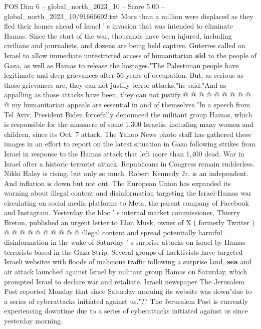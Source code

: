 \begin{textsample}{POS Dim 6 – global\_north\_2023\_10 – Score 5.00 – global\_north\_2023\_10/91666602.txt}
More than a million were displaced as they fled their homes ahead of Israel ' s invasion that was intended to eliminate Hamas.
Since the start of the war, thousands have been injured, including civilians and journalists, and dozens are being held captive.
Guterres called on Israel to allow immediate unrestricted access of humanitarian \textbf{aid} to the people of Gaza, as well as Hamas to release the hostages."The Palestinian people have legitimate and deep grievances after 56 years of occupation.
But, as serious as those grievances are, they can not justify terror attacks,"he said."And as appalling as those attacks have been, they can not justify @ @ @ @ @ @ @ @ @ @ my humanitarian appeals are essential in and of themselves."In a speech from Tel Aviv, President Biden forcefully denounced the militant group Hamas, which is responsible for the massacre of some 1,300 Israelis, including many women and children, since its Oct. 7 attack.
The Yahoo News photo staff has gathered these images in an effort to report on the latest situation in Gaza following strikes from Israel in response to the Hamas attack that left more than 1,400 dead.
War in Israel after a historic terrorist attack.
Republicans in Congress remain rudderless.
Nikki Haley is rising, but only so much.
Robert Kennedy Jr. is an independent.
And inflation is down but not out.
The European Union has expanded its warning about illegal content and disinformation targeting the Israel-Hamas war circulating on social media platforms to Meta, the parent company of Facebook and Instagram.
Yesterday the bloc ' s internal market commissioner, Thierry Breton, published an urgent letter to Elon Musk, owner of X ( formerly Twitter ) @ @ @ @ @ @ @ @ @ @ illegal content and spread potentially harmful disinformation in the wake of Saturday ' s surprise attacks on Israel by Hamas terrorists based in the Gaza Strip.
Several groups of hacktivists have targeted Israeli websites with floods of malicious traffic following a surprise land, \textbf{sea} and air attack launched against Israel by militant group Hamas on Saturday, which prompted Israel to declare war and retaliate.
Israeli newspaper The Jerusalem Post reported Monday that since Saturday morning its website was down"due to a series of cyberattacks initiated against us."??
The Jerusalem Post is currently experiencing downtime due to a series of cyberattacks initiated against us since yesterday morning.

\end{textsample}
